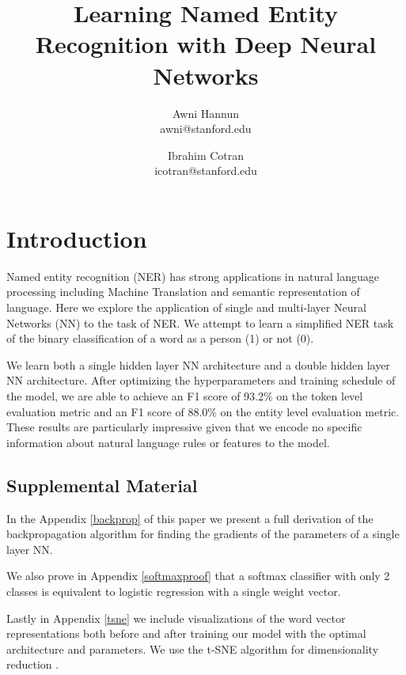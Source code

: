 \documentclass{article}
\begin{document}
\pagestyle{plain}

\title{Learning Named Entity Recognition with Deep Neural Networks}
\author{Awni Hannun\\
{\small awni@stanford.edu}\\
\and
Ibrahim Cotran\\
{\small icotran@stanford.edu}\\
}
\maketitle
\section{Introduction}
Named entity recognition (NER) has strong applications in natural language processing including Machine Translation and semantic representation of language. Here we explore the application of single and multi-layer Neural Networks (NN) to the task of NER. We attempt to learn a simplified NER task of the binary classification of a word as a person (1) or not (0).

We learn both a single hidden layer NN architecture and a double hidden layer NN architecture. After optimizing the hyperparameters and training schedule of the model, we are able to achieve an F1 score of 93.2\% on the token level evaluation metric and an F1 score of 88.0\% on the entity level evaluation metric.  These results are particularly impressive given that we encode no specific information about natural language rules or features to the model. 

\subsection{Supplemental Material}
In the Appendix \ref{backprop} of this paper we present a full derivation of the backpropagation algorithm for finding the gradients of the parameters of a single layer NN.  

We also prove in Appendix \ref{softmaxproof} that a softmax classifier with only 2 classes is equivalent to logistic regression with a single weight vector.

Lastly in  Appendix \ref{tsne} we include visualizations of the word vector representations both before and after training our model with the optimal architecture and parameters.  We use the t-SNE algorithm for dimensionality reduction \cite{tsne}.
\end{document}
